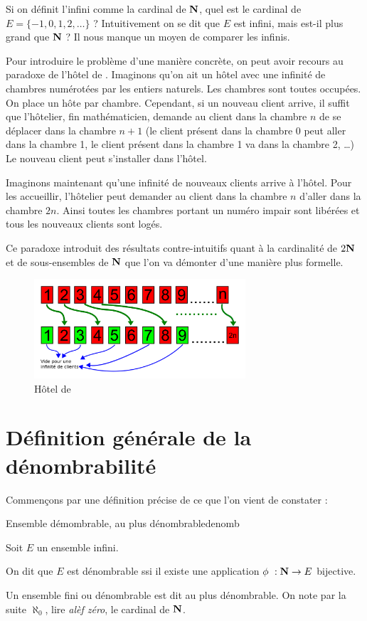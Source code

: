 \documentclass[a4paper,french,final]{memoir}
\begin{document}
Si on définit l'infini comme la cardinal de $\mathbf{N}$, quel est le cardinal de $E= \{-1, 0, 1, 2, \dots\}$ ? Intuitivement on se dit que $E$ est infini, mais est-il plus grand que $\mathbf{N}$ ? Il nous manque un moyen de comparer les infinis.

Pour introduire le problème d'une manière concrète, on peut avoir recours au paradoxe de l'hôtel de . Imaginons qu'on ait un hôtel avec une infinité de chambres numérotées par les entiers naturels. Les chambres sont toutes occupées. On place un hôte par chambre. Cependant, si un nouveau client arrive, il suffit que l'hôtelier, fin mathématicien, demande au client dans la chambre $n$ de se déplacer dans la chambre $n+1$ (le client présent dans la chambre 0 peut aller dans la chambre 1, le client présent dans la chambre 1 va dans la chambre 2, \dots) Le nouveau client peut s'installer dans l'hôtel.

Imaginons maintenant qu'une infinité de nouveaux clients arrive à l'hôtel. Pour les accueillir, l'hôtelier peut demander au client dans la chambre $n$ d'aller dans la chambre $2n$. Ainsi toutes les chambres portant un numéro impair sont libérées et tous les nouveaux clients sont logés.

Ce paradoxe introduit des résultats contre-intuitifs quant à la cardinalité de $2 \mathbf{N}$ et de sous-ensembles de $\mathbf{N}$ que l'on va démonter d'une manière plus formelle.

\begin{figure}[htb]
    \centering
    \includegraphics[width=0.7\textwidth,keepaspectratio]{hotel de hilbert.png}
    \caption{Hôtel de }
    \label{fig:hotel_hilbert}
\end{figure}
\clearpage
\section{Définition générale de la dénombrabilité}
Commençons par une définition précise de ce que l'on vient de constater :
\begin{defb}{Ensemble démombrable, au plus dénombrable}{denomb}

	 Soit $E$ un ensemble infini.

	 On dit que $E$ est dénombrable ssi il existe une application $\phi~: \NN \to E $ bijective.

	 Un ensemble fini ou dénombrable est dit au plus dénombrable. \newline
	 On note par la suite $\aleph_0$, lire \emph{alèf zéro}\footnotemark, le cardinal de $\mathbf{N}$.
\end{defb}
\end{document}

